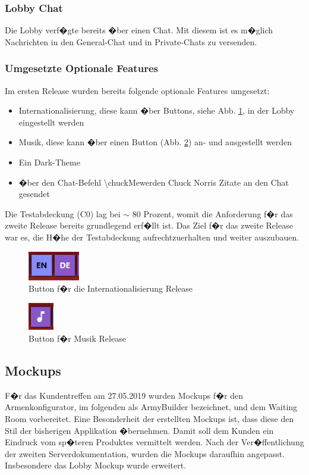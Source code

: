 \documentclass[12pt, titlepage]{scrartcl}
\newcommand{\RN}[1]{%
	\textup{\uppercase\expandafter{\romannumeral#1}}%
}
\begin{document}
	 	\subsubsection{Lobby Chat}
	 	Die Lobby verf�gte bereits �ber einen Chat. Mit diesem ist es m�glich Nachrichten in den General-Chat und in Private-Chats zu versenden.
	 	\subsubsection{Umgesetzte Optionale Features}
	 	Im ersten Release wurden bereits folgende optionale Features umgesetzt:
	 	\begin{itemize}
	 		\item Internationalisierung, diese kann �ber Buttons, siehe Abb. \ref{Internationalisierung_Release_One}, in der Lobby eingestellt werden 
	 		\item Musik, diese kann �ber einen Button (Abb. \ref{Musik_Release_One}) an- und ausgestellt werden 
	 		\item Ein Dark-Theme 
	 		\item �ber den Chat-Befehl \glqq \textbackslash chuckMe\grqq werden Chuck Norris Zitate an den Chat gesendet
	 	\end{itemize}
 		Die Testabdeckung (C0) lag bei $\sim$ 80 Prozent, womit die Anforderung f�r das zweite Release bereits grundlegend erf�llt ist. Das Ziel f�r das zweite Release war es, die H�he der Testabdeckung aufrechtzuerhalten und weiter auszubauen.
 		\begin{figure}[H] 
 			\centering
 			\includegraphics[width=0.2\textwidth]{Internationalisierung_Release_One.PNG}
 			\caption{Button f�r die Internationalisierung Release \RN{1}}
 			\label{Internationalisierung_Release_One}
 		\end{figure}
 		\begin{figure}[H] 
 			\centering
 			\includegraphics[width=0.1\textwidth]{Musik_Release_One.PNG}
 			\caption{Button f�r Musik Release \RN{1}}
 			\label{Musik_Release_One}
 		\end{figure}
 		
	\subsection{Mockups}
		F�r das Kundentreffen am 27.05.2019 wurden Mockups f�r den Armenkonfigurator, im folgenden als ArmyBuilder bezeichnet, und dem Waiting Room vorbereitet. Eine Besonderheit der erstellten Mockups ist, dass diese den Stil der bisherigen Applikation �bernehmen. Damit soll dem Kunden ein Eindruck vom sp�teren Produktes vermittelt werden. Nach der Ver�ffentlichung der zweiten Serverdokumentation, wurden die Mockups daraufhin angepasst. Insbesondere das  Lobby Mockup wurde erweitert.
\end{document}
